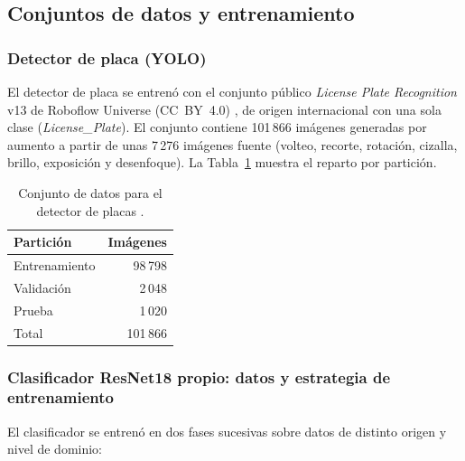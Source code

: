 \documentclass[11pt]{article}
\begin{document}
\subsection{Conjuntos de datos y entrenamiento}

\subsubsection{Detector de placa (YOLO)}

El detector de placa se entrenó con el conjunto público \emph{License Plate
Recognition} v13 de Roboflow Universe (CC~BY~4.0) \cite{ds_placas}, de origen
internacional con una sola clase (\emph{License\_Plate}). El conjunto contiene
101\,866 imágenes generadas por aumento a partir de unas 7\,276 imágenes fuente
(volteo, recorte, rotación, cizalla, brillo, exposición y desenfoque). La
Tabla~\ref{tab:ds_placas} muestra el reparto por partición.

\begin{table}[H]
    \centering
    \caption{Conjunto de datos para el detector de placas \cite{ds_placas}.}
    \label{tab:ds_placas}
    \begin{tabular}{lr}
        \toprule
        \textbf{Partición} & \textbf{Imágenes} \\
        \midrule
        Entrenamiento & 98\,798 \\
        Validación    & 2\,048 \\
        Prueba        & 1\,020 \\
        Total         & 101\,866 \\
        \bottomrule
    \end{tabular}
\end{table}

\subsubsection{Clasificador ResNet18 propio: datos y estrategia de entrenamiento}

El clasificador se entrenó en dos fases sucesivas sobre datos de distinto origen y
nivel de dominio:
\end{document}
